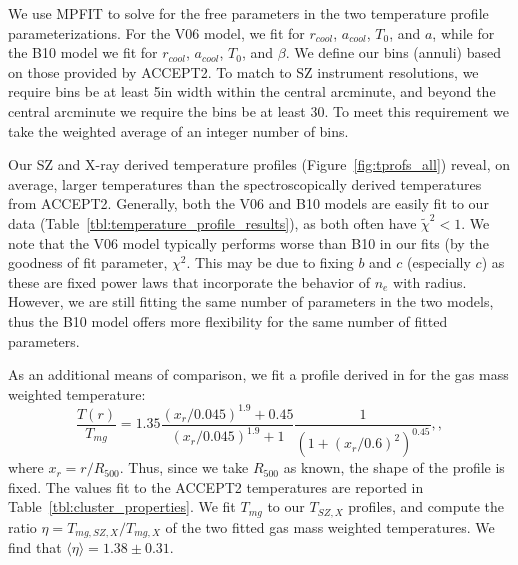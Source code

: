 \documentclass[iop,numberedappendix,apj]{emulateapj}
\begin{document}
We use MPFIT \citep{markwardt2009} to solve for the free parameters in the two temperature profile parameterizations. For 
the V06 model, we fit for  $r_{cool}$, $a_{cool}$, $T_0$, and $a$, while for the B10 model we fit for $r_{cool}$, $a_{cool}$, 
$T_0$, and $\beta$. We define our bins (annuli) based on those provided by ACCEPT2. To match to SZ instrument resolutions, 
we require bins be at least 5\asecs in width within the central arcminute, and beyond the central arcminute we require the 
bins be at least 30\asec. To meet this requirement we take the weighted average of an integer number of bins.

Our SZ and X-ray derived temperature profiles (Figure~\ref{fig:tprofs_all}) reveal, on average, 
larger temperatures than the spectroscopically derived temperatures from ACCEPT2. Generally, both the V06 and B10
models are easily fit to our data (Table~\ref{tbl:temperature_profile_results}), as both often have $\tilde{\chi}^2 < 1$.
We note that the V06 model typically performs worse than B10 in our fits (by the goodness of fit parameter, $\chi^2$. 
This may be due to fixing $b$ and $c$ (especially $c$) as these are fixed power laws that incorporate the
behavior of $n_e$ with radius. However, we are still fitting the same number of parameters in the two models, thus
the B10 model offers more flexibility for the same number of fitted parameters. 

As an additional means of comparison, we fit a profile derived in  for the gas mass weighted
temperature:
\begin{equation}
  \frac{T(r)}{T_{mg}} = 1.35 \frac{(x_r/0.045)^{1.9} + 0.45}{(x_r/0.045)^{1.9} + 1} \frac{1}{(1+(x_r/0.6)^2)^{0.45}},
  \label{eqn:tmg},
\end{equation}
where $x_r = r / R_{500}$. Thus, since we take $R_{500}$ as known, the shape of the profile is fixed. The values
fit to the ACCEPT2 temperatures are reported in Table~\ref{tbl:cluster_properties}. We fit $T_{mg}$ to our
$T_{SZ,X}$ profiles, and compute the ratio  $\eta = T_{mg,SZ,X} / T_{mg,X}$ of the two fitted gas mass weighted 
temperatures. We find that $\langle \eta \rangle = 1.38 \pm 0.31$. 
\end{document}
